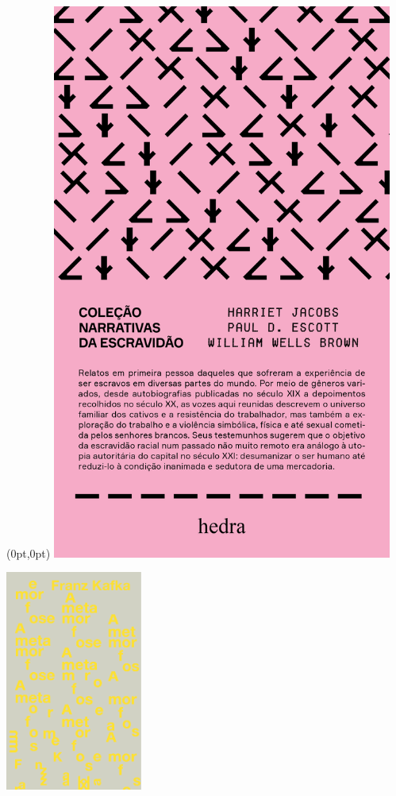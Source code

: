 \pagestyle{hedra}
\label{hedra}

\begin{textblock*}{5.625in}(0pt,0pt)%
\vspace*{-1.45cm}
\hspace*{-1.8cm}\includegraphics*[width=112mm]{./imgs/HEDRA.png}
\end{textblock*}

\pagebreak


\hspace{.5cm}

\begin{center}
\hspace*{-2.5cm}
\hspace*{2cm}\includegraphics[width=45mm]{./imgs/kafka.png}
\end{center}

